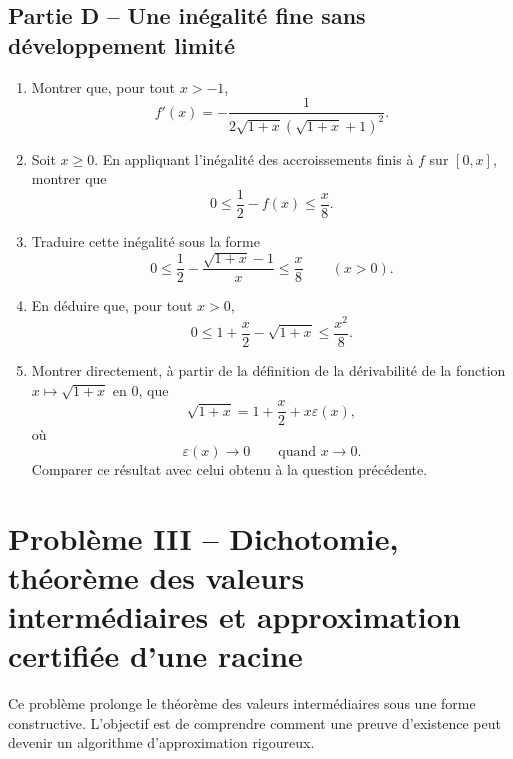 \documentclass[11pt,a4paper]{article}
\newcommand{\eps}{\varepsilon}
\begin{document}

\subsection*{Partie D -- Une inégalité fine sans développement limité}

\begin{enumerate}[resume]
    \item Montrer que, pour tout \(x>-1\),
    \[
    f'(x)=-\frac{1}{2\sqrt{1+x}(\sqrt{1+x}+1)^2}.
    \]

    \item Soit \(x\geq 0\). En appliquant l'inégalité des accroissements finis à \(f\) sur \([0,x]\), montrer que
    \[
    0\leq \frac12-f(x)\leq \frac{x}{8}.
    \]

    \item Traduire cette inégalité sous la forme
    \[
    0\leq \frac12-\frac{\sqrt{1+x}-1}{x}\leq \frac{x}{8}
    \qquad (x>0).
    \]

    \item En déduire que, pour tout \(x>0\),
    \[
    0\leq 1+\frac{x}{2}-\sqrt{1+x}\leq \frac{x^2}{8}.
    \]

    \item Montrer directement, à partir de la définition de la dérivabilité de la fonction \(x\mapsto \sqrt{1+x}\) en \(0\), que
    \[
    \sqrt{1+x}=1+\frac{x}{2}+x\eps(x),
    \]
    où
    \[
    \eps(x)\longrightarrow 0
    \qquad \text{quand } x\to 0.
    \]
    Comparer ce résultat avec celui obtenu à la question précédente.
\end{enumerate}

\newpage



\section*{Problème III -- Dichotomie, théorème des valeurs intermédiaires et approximation certifiée d'une racine}

Ce problème prolonge le théorème des valeurs intermédiaires sous une forme constructive.  
L'objectif est de comprendre comment une preuve d'existence peut devenir un algorithme d'approximation rigoureux.
\end{document}
